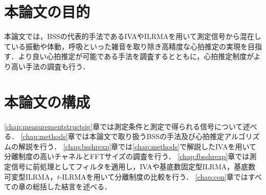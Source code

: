 \section{本論文の目的}
本論文では，BSSの代表的手法であるIVAやILRMAを用いて測定信号から混在している振動や体動，呼吸といった雑音を取り除き高精度な心拍推定の実現を目指す．より良い心拍推定が可能である手法を調査するとともに，心拍推定制度がより高い手法の調査も行う．
\section{本論文の構成}
\ref{chap:measurementstructsig}章では測定条件と測定で得られる信号について述べる．
\ref{chap:methods}章では本論文で取り扱うBSSの手法及び心拍推定アルゴリズムの解説を行う．
\ref{chap:bsshrexp}章では\ref{chap:methods}で解説したIVAを用いて分離制度の高いチャネルとFFTサイズの調査を行う．
\ref{chap:fbsshrexp}章では測定信号に前処理としてフィルタを適用し，IVAや基底数固定型ILRMA，基底数可変型ILRMA，$t$-ILRMAを用いて分離制度の比較を行う．
\ref{chap:con}章ではすべての章の総括した結言を述べる．